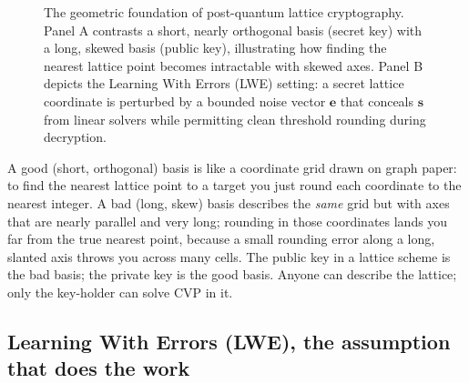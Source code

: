 \begin{figure}[H]
\caption{The geometric foundation of post-quantum lattice cryptography. Panel A contrasts a short, nearly orthogonal basis (secret key) with a long, skewed basis (public key), illustrating how finding the nearest lattice point becomes intractable with skewed axes. Panel B depicts the Learning With Errors (LWE) setting: a secret lattice coordinate is perturbed by a bounded noise vector $\mathbf{e}$ that conceals $\mathbf{s}$ from linear solvers while permitting clean threshold rounding during decryption.}
\label{ch35:fig-lattice-lwe}
\end{figure}

\begin{intuitionbox}
A good (short, orthogonal) basis is like a coordinate grid drawn on graph paper: to find the nearest lattice point to a target you just round each coordinate to the nearest integer. A bad (long, skew) basis describes the \emph{same} grid but with axes that are nearly parallel and very long; rounding in those coordinates lands you far from the true nearest point, because a small rounding error along a long, slanted axis throws you across many cells. The public key in a lattice scheme is the bad basis; the private key is the good basis. Anyone can describe the lattice; only the key-holder can solve CVP in it.
\end{intuitionbox}

\subsection{Learning With Errors (LWE), the assumption that does the work}
\label{ch35:lwe}

